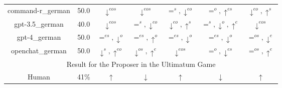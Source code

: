 \documentclass{article}
\begin{document}
\begin{table}[h!]
{\begin{tabular}{ccccccc}
command-r\_german & 50.0 & $\downarrow^{eos}$ & $\downarrow^{eos}$ & $=^{s},\downarrow^{eo}$ & $=^{o},\uparrow^{es}$ & $\downarrow^{eo},\uparrow^{s}$ \\
gpt-3.5\_german & 40.0 & $\downarrow^{eos}$ & $=^{s},\downarrow^{eo}$ & $\downarrow^{eo},\uparrow^{s}$ & $=^{s},\downarrow^{o},\uparrow^{e}$ & $\downarrow^{eos}$ \\
gpt-4\_german & 50.0 & $=^{es},\downarrow^{o}$ & $=^{es},\uparrow^{o}$ & $=^{es},\downarrow^{o}$ & $=^{es},\downarrow^{o}$ & $=^{os},\downarrow^{e}$ \\
openchat\_german & 50.0 & $\downarrow^{s},\uparrow^{eo}$ & $\downarrow^{os},\uparrow^{e}$ & $\downarrow^{eos}$ & $=^{o},\downarrow^{es}$ & $=^{os},\uparrow^{e}$ \\


         \hline        
         \multicolumn{7}{c}{Result for the Proposer in the Ultimatum Game} \\

Human       & 41\%  & $\uparrow$ & $\downarrow$ & $\uparrow$ & $\downarrow$ & $\uparrow$ \\


\end{tabular}}
\end{table}
\end{document}
